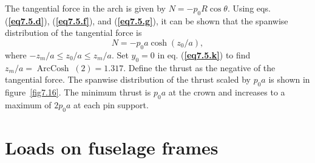 \documentclass{AeroStructure-ERJohnson}
\begin{document}
\begin{example}
The tangential force in the arch is given by $N=-p_{0} R \cos \theta$. Using eqs. (\textbf{\ref{eq7.5.d}}), (\textbf{\ref{eq7.5.f}}), and (\textbf{\ref{eq7.5.g}}), it can be shown that the spanwise distribution of the tangential force is
\begin{equation}
N=-p_{0} a \cosh \left(z_{0} / a\right), \label{eq7.5.l}\tag{l}
\end{equation}
where $-z_{m} / a \leq z_{0} / a \leq z_{m} / a$. Set $y_{0}=0$ in eq. (\textbf{\ref{eq7.5.k}}) to find $z_{m} / a=\operatorname{ArcCosh}\;(2)=1.317$. Define the thrust as the negative of the tangential force. The spanwise distribution of the thrust scaled by $p_{0} a$ is shown in figure~\ref{fig7.16}. The minimum thrust is $p_{0} a$ at the crown and increases to a maximum of $2 p_{0} a$ at each pin support.
\end{example}

{\def\thefigure{7.16}
\vspace*{-\baselineskip}
}
\vspace*{-1.6\baselineskip}


\section{Loads on fuselage frames}\label{sec7.4}
\end{document}
